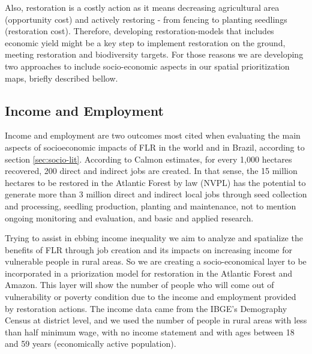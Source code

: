  Also, restoration is a costly action as it means decreasing agricultural area (opportunity cost) and actively restoring - from fencing to planting seedlings (restoration cost). Therefore, developing restoration-models that includes economic yield might be a key step to implement restoration on the ground, meeting restoration and biodiversity targets.
 For those reasons we are developing two approaches to include socio-economic aspects in our spatial prioritization maps, briefly described bellow.
 
 
\subsection{\large Income and Employment} \label{subsec:socio-income}

Income and employment are two outcomes most cited when evaluating the main aspects of socioeconomic impacts of FLR in the world \citep{Adams2016a} and in Brazil, according to section \ref{sec:socio-lit}. According to Calmon \cite{Calmon2011a} estimates, for every 1,000 hectares recovered, 200 direct and indirect jobs are created. In that sense, the 15 million hectares to be restored in the Atlantic Forest by law (NVPL) has the potential to generate more than 3 million direct and indirect local jobs through seed collection and processing, seedling production, planting and maintenance, not to mention ongoing monitoring and evaluation, and basic and applied research. 

Trying to assist in ebbing income inequality we aim to analyze and spatialize the benefits of FLR through job creation and its impacts on increasing income for vulnerable people in rural areas. So we are creating a socio-economical layer to be incorporated in a priorization model for restoration in the Atlantic Forest and Amazon. This layer will show the number of people who will come out of vulnerability or poverty condition due to the income and employment provided by restoration actions. The income data came from the IBGE's Demography Census \cite{20182018Contas2018} at district level, and we used the number of people in rural areas with less than half minimum wage, with no income statement and with ages between 18 and 59 years (economically active population).  


